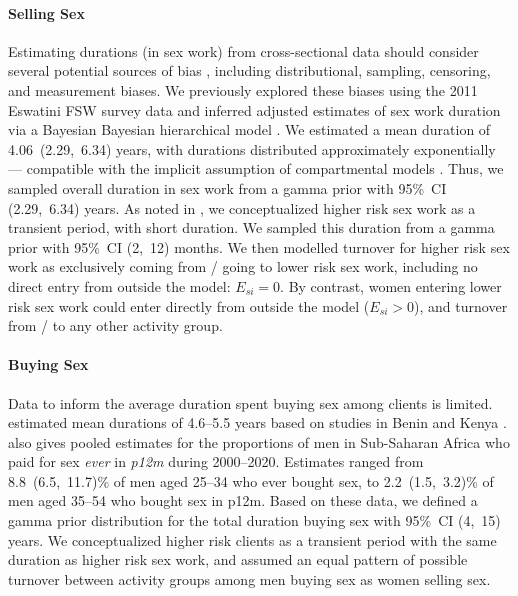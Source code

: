 \paragraph{Selling Sex}
Estimating durations (\eg in sex work) from cross-sectional data
should consider several potential sources of bias \cite{Fazito2012,Knight2023bias},
including distributional, sampling, censoring, and measurement biases.
We previously explored these biases using the 2011 Eswatini FSW survey data \cite{Baral2014}
and inferred adjusted estimates of sex work duration
via a Bayesian Bayesian hierarchical model \cite{Knight2023bias}.
We estimated a mean duration of 4.06~(2.29,~6.34) years,
with durations distributed approximately exponentially
--- compatible with the implicit assumption of compartmental models \cite{Anderson1991}.
Thus, we sampled overall duration in sex work from a gamma prior with 95\%~CI (2.29,~6.34) years.
As noted in , we conceptualized higher risk sex work as
a transient period, with short duration.
We sampled this duration from a gamma prior with 95\%~CI (2,~12) months.
We then modelled turnover for higher risk sex work as
exclusively coming from / going to lower risk sex work,
including no direct entry from outside the model: $E_{si} = 0$.
By contrast, women entering lower risk sex work could
enter directly from outside the model ($E_{si} > 0$),
and turnover from / to any other activity group.
\paragraph{Buying Sex}
Data to inform the average duration spent buying sex among clients is limited.
\citet{Fazito2012} estimated mean durations of 4.6--5.5 years
based on studies in Benin \cite{Lowndes2000} and Kenya \cite{Voeten2002}.
\citet[Table~G]{Hodgins2022} also gives pooled estimates for
the proportions of men in Sub-Saharan Africa
who paid for sex \emph{ever} \vs in \emph{p12m} during 2000--2020.
Estimates ranged from 8.8~(6.5,~11.7)\% of men aged 25--34 who ever bought sex,
to 2.2~(1.5,~3.2)\% of men aged 35--54 who bought sex in p12m.
Based on these data, we defined a gamma prior distribution for
the total duration buying sex with 95\%~CI (4,~15) years.
We conceptualized higher risk clients as a transient period
with the same duration as higher risk sex work,
and assumed an equal pattern of possible turnover between activity groups
among men buying sex as women selling sex.

